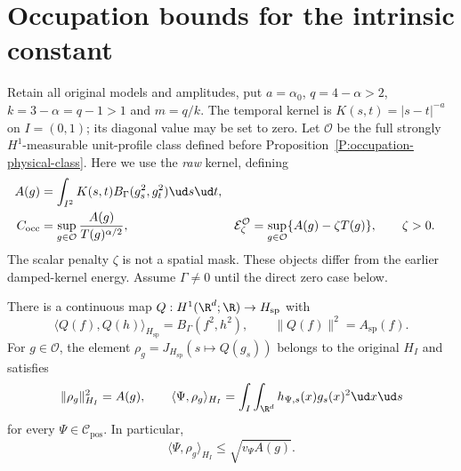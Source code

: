 \section{Occupation bounds for the intrinsic constant}
\label{S:intrinsic-occupation-ceiling}

Retain all original models and amplitudes, put $a=\alpha_0$,
$q=4-\alpha>2$, $k=3-\alpha=q-1>1$ and $m=q/k$.
The temporal kernel is $K(s,t)=|s-t|^{-a}$ on $I=(0,1)$;
its diagonal value may be set to zero.
Let $\mathcal O$ be the full strongly $H^1$-measurable unit-profile
class defined before Proposition~\ref{P:occupation-physical-class}.
Here we use the \emph{raw} kernel, defining
\begin{equation}\label{E:raw-occupation-definitions}
  \begin{aligned}
    A(g)&=\int_{I^2}K(s,t)B_\Gamma(g_s^2,g_t^2)\ud s\ud t,\\
    C_{\rm occ}&=\sup_{g\in\mathcal O}
    \frac{A(g)}{T(g)^{\alpha/2}},&
    \mathcal E_\zeta^{\mathcal O}
    &=\sup_{g\in\mathcal O}\{A(g)-\zeta T(g)\},\qquad \zeta>0.
  \end{aligned}
\end{equation}
The scalar penalty $\zeta$ is not a spatial mask.
These objects differ from the earlier damped-kernel energy.
Assume $\Gamma\ne0$ until the direct zero case below.

\begin{lemma}
  \label{L:occupation-raw-square}
  There is a continuous map $Q:H^1(\R^d;\R)\to H_{\mathrm{sp}}$ with
  \[
    \langle Q(f),Q(h)\rangle_{H_{\mathrm{sp}}}
    =B_\Gamma(f^2,h^2),\qquad
    \|Q(f)\|^2=A_{\mathrm{sp}}(f).
  \]
  For $g\in\mathcal O$, the element
  $\rho_g=J_{H_{\mathrm{sp}}}(s\mapsto Q(g_s))$ belongs to the original
  $H_I$ and satisfies
  \begin{equation}\label{E:occupation-raw-identities}
    \|\rho_g\|_{H_I}^2=A(g),\qquad
    \langle\Psi,\rho_g\rangle_{H_I}
    =\int_I\int_{\R^d}h_{\Psi,s}(x)g_s(x)^2\ud x\ud s
  \end{equation}
  for every $\Psi\in\mathcal C_{\mathrm{pos}}$. In particular,
  \[
    \langle\Psi,\rho_g\rangle_{H_I}\le\sqrt{v_\Psi A(g)}.
  \]
\end{lemma}

